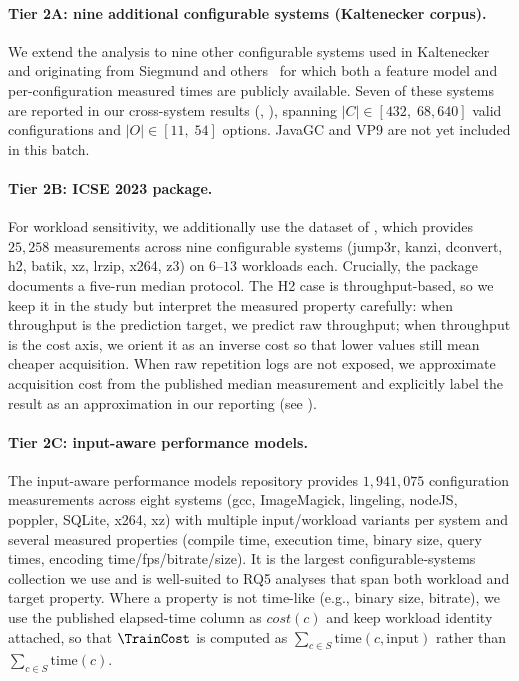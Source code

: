 \paragraph*{Tier 2A: nine additional configurable systems (Kaltenecker corpus).}
We extend the analysis to nine other configurable systems used in
Kaltenecker \etal~\cite{kaltenecker2019} and originating from
Siegmund \etal{} and others~\cite{siegmund2015FSE,julianasurvey} for which
both a feature model and per-configuration measured times are publicly
available. Seven of these systems are reported in our cross-system
results (, ), spanning
$|C|\in[432,\;68{,}640]$ valid configurations and $|O|\in[11,\;54]$
options. JavaGC and VP9 are not yet included in this batch.

\paragraph*{Tier 2B: \dsWLI ICSE 2023 package.}
For workload sensitivity, we additionally use the \dsWLI dataset
of , which
provides $25{,}258$ measurements across nine configurable systems
(jump3r, kanzi, dconvert, h2, batik, xz, lrzip, x264, z3) on $6$--$13$
workloads each. Crucially, the package documents a five-run median
protocol. The H2 case is throughput-based, so we keep it in the study but
interpret the measured property carefully: when throughput is the
prediction target, we predict raw throughput; when throughput is the cost
axis, we orient it as an inverse cost so that lower values still mean
cheaper acquisition. When raw repetition logs are not exposed, we
approximate acquisition cost from the published median measurement and
explicitly label the result as an approximation in our reporting (see
).

\paragraph*{Tier 2C: input-aware performance models.}
The input-aware performance models repository
 provides
$1{,}941{,}075$ configuration measurements across eight systems (gcc,
ImageMagick, lingeling, nodeJS, poppler, SQLite, x264, xz) with multiple
input/workload variants per system and several measured properties
(compile time, execution time, binary size, query times, encoding
time/fps/bitrate/size). It is the largest configurable-systems collection
we use and is well-suited to RQ5 analyses that span both workload and
target property. Where a property is not time-like (e.g., binary size,
bitrate), we use the published elapsed-time column as
$\mathit{cost}(c)$ and keep workload identity attached, so that
$\TrainCost$ is computed as $\sum_{c\in S}\mathrm{time}(c, \mathrm{input})$
rather than $\sum_{c\in S}\mathrm{time}(c)$.

